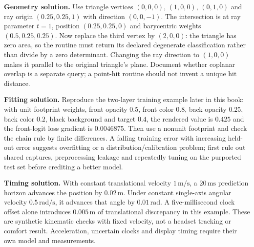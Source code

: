 \textbf{Geometry solution.} Use triangle vertices \((0,0,0)\), \((1,0,0)\), \((0,1,0)\) and ray origin \((0.25,0.25,1)\) with direction \((0,0,-1)\). The intersection is at ray parameter \(t=1\), position \((0.25,0.25,0)\) and barycentric weights \((0.5,0.25,0.25)\). Now replace the third vertex by \((2,0,0)\): the triangle has zero area, so the routine must return its declared degenerate classification rather than divide by a zero determinant. Changing the ray direction to \((1,0,0)\) makes it parallel to the original triangle's plane. Document whether coplanar overlap is a separate query; a point-hit routine should not invent a unique hit distance.

\textbf{Fitting solution.} Reproduce the two-layer training example later in this book: with unit footprint weights, front opacity \(0.5\), front color \(0.8\), back opacity \(0.25\), back color \(0.2\), black background and target \(0.4\), the rendered value is \(0.425\) and the front-logit loss gradient is \(0.0046875\). Then use a nonunit footprint and check the chain rule by finite differences. A falling training error with increasing held-out error suggests overfitting or a distribution/calibration problem; first rule out shared captures, preprocessing leakage and repeatedly tuning on the purported test set before crediting a better model.

\textbf{Timing solution.} With constant translational velocity \(1\,\mathrm{m/s}\), a \(20\,\mathrm{ms}\) prediction horizon advances the position by \(0.02\,\mathrm m\). Under constant single-axis angular velocity \(0.5\,\mathrm{rad/s}\), it advances that angle by \(0.01\,\mathrm{rad}\). A five-millisecond clock offset alone introduces \(0.005\,\mathrm m\) of translational discrepancy in this example. These are synthetic kinematic checks with fixed velocity, not a headset tracking or comfort result. Acceleration, uncertain clocks and display timing require their own model and measurements.

